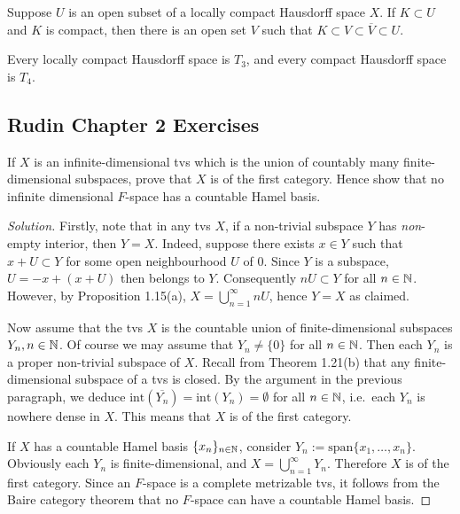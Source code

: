 \begin{theorem}
	Suppose $U$ is an open subset of a locally compact Hausdorff space $X$. If $K \subset U$ and $K$ is compact, then there is an open set $V$ such that $K \subset V \subset \overline{V} \subset U$.
\end{theorem}

\begin{corollary}
	Every locally compact Hausdorff space is $T_3$, and every compact Hausdorff space is $T_4$.
\end{corollary}

\subsection{Rudin Chapter 2 Exercises}

\begin{exercise}[Ex.\ 2.1]
	If $X$ is an infinite-dimensional tvs which is the union of countably many finite-dimensional subspaces, prove that $X$ is of the first category. Hence show that no infinite dimensional $F$-space has a countable Hamel basis.
\end{exercise}

\begin{proof}[Solution]
	Firstly, note that in any tvs $X$, if a non-trivial subspace $Y$ has \emph{non}-empty interior, then $Y = X$. Indeed, suppose there exists $x \in Y$ such that $x+U \subset Y$ for some open neighbourhood $U$ of 0. Since $Y$ is a subspace, $U = -x + (x+U)$ then belongs to $Y$. Consequently $nU \subset Y$ for all $n \in \mathbb{N}$. However, by Proposition 1.15(a), $X = \bigcup_{n=1}^\infty nU$, hence $Y=X$ as claimed.
	
	Now assume that the tvs $X$ is the countable union of finite-dimensional subspaces $Y_n, n \in \mathbb{N}$. Of course we may assume that $Y_n \ne \{0\}$ for all $n \in \mathbb{N}$. Then each $Y_n$ is a proper non-trivial subspace of $X$. Recall from Theorem 1.21(b) that any finite-dimensional subspace of a tvs is closed. By the argument in the previous paragraph, we deduce $\text{int}(\overline{Y_n}) = \text{int}(Y_n) = \emptyset$ for all $n \in \mathbb{N}$, i.e.\ each $Y_n$ is nowhere dense in $X$. This means that $X$ is of the first category.
	
	If $X$ has a countable Hamel basis $\{x_n\}_{n \in \mathbb{N}}$, consider $Y_n := \text{span}\{x_1, \ldots, x_n\}$. Obviously each $Y_n$ is finite-dimensional, and $X = \bigcup_{n=1}^\infty Y_n$. Therefore $X$ is of the first category. Since an $F$-space is a complete metrizable tvs, it follows from the Baire category theorem that no $F$-space can have a countable Hamel basis.
\end{proof}

